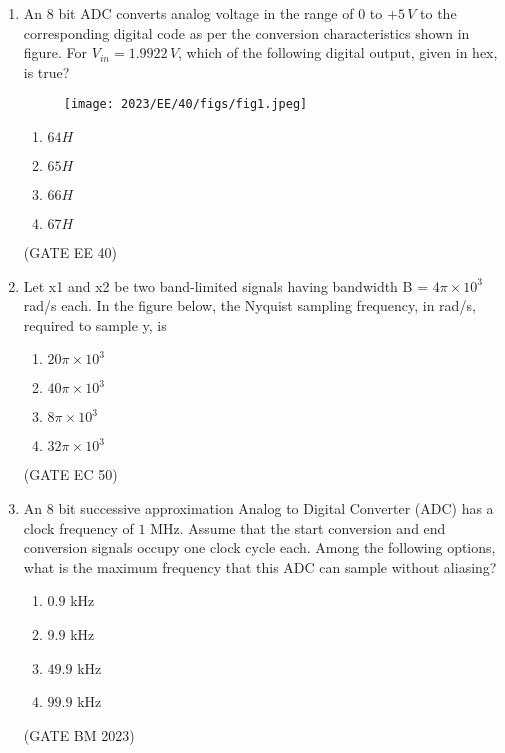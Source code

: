 \begin{enumerate}[label=\thechapter.\arabic*,ref=\thechapter.\theenumi]

\item An $8$ bit ADC converts analog voltage in the range of $0$ to $+5\, V$ to the corresponding digital code as per the conversion characteristics shown in figure. For $V_{in} = 1.9922\, V$, which of the following digital output, given in hex, is true?

\begin{figure}[!h]
    \centering
    \texttt{[image: 2023/EE/40/figs/fig1.jpeg]}
    \caption{}
    \label{fig:ADC_gate.ee.23.40}
\end{figure}
\begin{enumerate}[label=(\alph*)]
    \item $64H$
    \item $65H$
    \item $66H$
    \item $67H$
\end{enumerate} \hfill(GATE EE 40)

\solution

\newpage
\item Let x1 and x2 be two band-limited signals having bandwidth B = $4\pi\times10^3$
rad/s each. In the figure below, the Nyquist sampling frequency, in
rad/s, required to sample y, is
  \\
\begin{enumerate}[label=(\alph*)]
    \item $20\pi\times10^3$
    \item $40\pi\times10^3$
    \item $8\pi\times10^3$
    \item $32\pi\times10^3$
\end{enumerate} \hfill(GATE EC 50)


\solution

\newpage


\item An $8$ bit successive approximation Analog to Digital Converter (ADC) has a clock
frequency of $1$ MHz. Assume that the start conversion and end conversion signals
occupy one clock cycle each. Among the following options, what is the maximum
frequency that this ADC can sample without aliasing?
\begin{enumerate}[label=\alph*)]
    \item $0.9$ kHz
    \item $9.9$ kHz
    \item $49.9$ kHz
    \item $99.9$ kHz
\end{enumerate}
\hfill(GATE BM 2023)


\end{enumerate}
